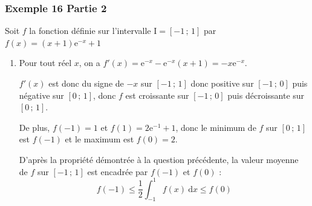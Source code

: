 \documentclass[11pt, hyperref={urlcolor=red,%
            linkcolor=blue, %
            colorlinks=true}]{beamer}
\newcommand{\Interff}[2]{\left[#1\, ;\, #2\right]}
\newcommand{\dx}{\ensuremath{\text{d}x}}		%
\newcommand{\integralex}[3]{\int_{#1}^{#2} #3 \ \dx}
\begin{document}
\begin{frame}
\frametitle{Exemple  16 Partie 2 }
\label{exemple16}
Soit $f$ la fonction définie sur l'intervalle  $\text{I}=\Interff{-1}{1}$ par $f(x)=(x+1)\text{e}^{-x}+1$
\begin{enumerate}
\item  Pour tout réel $x$, on a $f'(x)=\text{e}^{-x} - \text{e}^{-x}(x+1)=-x\text{e}^{-x}$.

$f'(x)$ est donc du signe de $-x$ sur $\Interff{-1}{1}$  donc positive sur $\Interff{-1}{0}$ puis négative sur $\Interff{0}{1}$, donc $f$ est croissante sur  $\Interff{-1}{0}$ puis décroissante sur $\Interff{0}{1}$.

De plus, $f(-1)=1$ et $f(1)=2\text{e}^{-1}+1$, donc le minimum de $f$ sur $\Interff{0}{1}$ est $f(-1)$ et le maximum est $f(0)=2$.

D'après la propriété démontrée à la question précédente, la valeur moyenne de $f$ sur $\Interff{-1}{1}$ est encadrée par $f(-1)$ et $f(0)$ :
\begin{equation*}
f(-1) \leqslant  \frac{1}{2} \integralex{-1}{1}{f(x)} \leqslant f(0)
\end{equation*}
\end{enumerate}
\end{frame}
\end{document}

